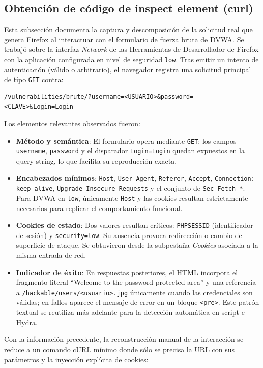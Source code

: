 \documentclass[letterpaper,12pt]{article}
\let\origsubsection\subsection
\renewcommand{\subsection}{\FloatBarrier\origsubsection}
\begin{document}
\subsection{Obtención de código de inspect element (curl)}
Esta subsección documenta la captura y descomposición de la solicitud real que genera Firefox al interactuar con el formulario de fuerza bruta de DVWA. Se trabajó sobre la interfaz \emph{Network} de las Herramientas de Desarrollador de Firefox con la aplicación configurada en nivel de seguridad \texttt{low}. Tras emitir un intento de autenticación (válido o arbitrario), el navegador registra una solicitud principal de tipo \texttt{GET} contra:
\begin{verbatim}
/vulnerabilities/brute/?username=<USUARIO>&password=<CLAVE>&Login=Login
\end{verbatim}
Los elementos relevantes observados fueron:
\begin{itemize}
        \item \textbf{Método y semántica}: El formulario opera mediante \texttt{GET}; los campos \texttt{username}, \texttt{password} y el disparador \texttt{Login=Login} quedan expuestos en la query string, lo que facilita su reproducción exacta.
        \item \textbf{Encabezados mínimos}: \texttt{Host}, \texttt{User-Agent}, \texttt{Referer}, \texttt{Accept}, \texttt{Connection: keep-alive}, \texttt{Upgrade-Insecure-Requests} y el conjunto de \texttt{Sec-Fetch-*}. Para DVWA en \texttt{low}, únicamente \texttt{Host} y las cookies resultan estrictamente necesarios para replicar el comportamiento funcional.
        \item \textbf{Cookies de estado}: Dos valores resultan críticos: \texttt{PHPSESSID} (identificador de sesión) y \texttt{security=low}. Su ausencia provoca redirección o cambio de superficie de ataque. Se obtuvieron desde la subpestaña \emph{Cookies} asociada a la misma entrada de red.
        \item \textbf{Indicador de éxito}: En respuestas posteriores, el HTML incorpora el fragmento literal ``Welcome to the password protected area'' y una referencia a \texttt{/hackable/users/<usuario>.jpg} únicamente cuando las credenciales son válidas; en fallos aparece el mensaje de error en un bloque \texttt{<pre>}. Este patrón textual se reutiliza más adelante para la detección automática en script e Hydra.
\end{itemize}
Con la información precedente, la reconstrucción manual de la interacción se reduce a un comando cURL mínimo donde sólo se precisa la URL con sus parámetros y la inyección explícita de cookies:
\end{document}
